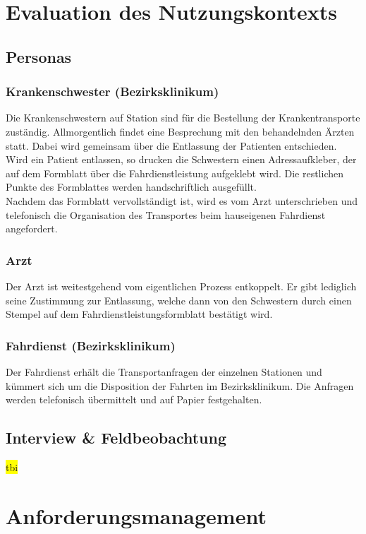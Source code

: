 \documentclass[a4paper, ngerman, 12pt]{scrartcl}
\begin{document}
\section{Evaluation des Nutzungskontexts}
\subsection{Personas}
\subsubsection{Krankenschwester (Bezirksklinikum)	}
Die Krankenschwestern auf Station sind für die Bestellung der Krankentransporte zuständig. Allmorgentlich findet eine Besprechung mit den behandelnden Ärzten statt. Dabei wird gemeinsam über die Entlassung der Patienten entschieden. Wird ein Patient entlassen, so drucken die Schwestern einen Adressaufkleber, der auf dem Formblatt über die Fahrdienstleistung aufgeklebt wird. Die restlichen Punkte des Formblattes werden handschriftlich ausgefüllt.\\
Nachdem das Formblatt vervollständigt ist, wird es vom Arzt unterschrieben und telefonisch die Organisation des Transportes beim hauseigenen Fahrdienst angefordert.
\subsubsection{Arzt}
Der Arzt ist weitestgehend vom eigentlichen Prozess entkoppelt. Er gibt lediglich seine Zustimmung zur Entlassung, welche dann von den Schwestern durch einen Stempel auf dem Fahrdienstleistungsformblatt bestätigt wird.
\subsubsection{Fahrdienst (Bezirksklinikum)}
Der Fahrdienst erhält die Transportanfragen der einzelnen Stationen und kümmert sich um die Disposition der Fahrten im Bezirksklinikum. Die Anfragen werden telefonisch übermittelt und auf Papier festgehalten.
\subsection{Interview \& Feldbeobachtung}
\colorbox{yellow}{tbi}\\
\section{Anforderungsmanagement}
\end{document}
